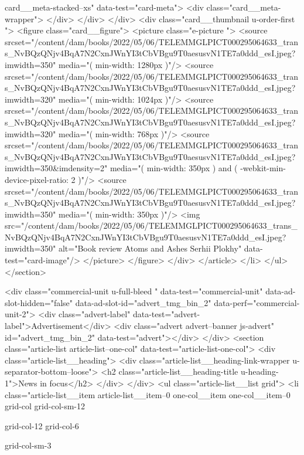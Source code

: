 {{{						
						card__meta-stacked--xs" data-test="card-meta">
<div class="card__meta-wrapper">
</div>
</div>
</div>
<div class="card__thumbnail u-order-first ">
<figure class="card__figure">
<picture class="e-picture   ">
<source srcset="/content/dam/books/2022/05/06/TELEMMGLPICT000295064633_trans_NvBQzQNjv4BqA7N2CxnJWnYI3tCbVBgu9T0aesusvN1TE7a0ddd_esI.jpeg?imwidth=350" media="( min-width: 1280px )"/>
<source srcset="/content/dam/books/2022/05/06/TELEMMGLPICT000295064633_trans_NvBQzQNjv4BqA7N2CxnJWnYI3tCbVBgu9T0aesusvN1TE7a0ddd_esI.jpeg?imwidth=320" media="( min-width: 1024px )"/>
<source srcset="/content/dam/books/2022/05/06/TELEMMGLPICT000295064633_trans_NvBQzQNjv4BqA7N2CxnJWnYI3tCbVBgu9T0aesusvN1TE7a0ddd_esI.jpeg?imwidth=320" media="( min-width: 768px )"/>
<source srcset="/content/dam/books/2022/05/06/TELEMMGLPICT000295064633_trans_NvBQzQNjv4BqA7N2CxnJWnYI3tCbVBgu9T0aesusvN1TE7a0ddd_esI.jpeg?imwidth=350&imdensity=2" media="( min-width: 350px ) and ( -webkit-min-device-pixel-ratio: 2 )"/>
<source srcset="/content/dam/books/2022/05/06/TELEMMGLPICT000295064633_trans_NvBQzQNjv4BqA7N2CxnJWnYI3tCbVBgu9T0aesusvN1TE7a0ddd_esI.jpeg?imwidth=350" media="( min-width: 350px )"/>
<img src="/content/dam/books/2022/05/06/TELEMMGLPICT000295064633_trans_NvBQzQNjv4BqA7N2CxnJWnYI3tCbVBgu9T0aesusvN1TE7a0ddd_esI.jpeg?imwidth=350" alt="Book review Atoms and Ashes Serhii Plokhy" data-test="card-image"/>
</picture>
</figure>
</div>
</article>
</li>
</ul>
</section>

		
			
				
			
	
<div class="commercial-unit u-full-bleed " data-test="commercial-unit" data-ad-slot-hidden="false" data-ad-slot-id="advert_tmg_bin_2" data-perf="commercial-unit-2">
<div class="advert-label" data-test="advert-label">Advertisement</div>
<div class="advert advert--banner js-advert" id="advert_tmg_bin_2" data-test="advert"></div>
</div>
<section class="article-list article-list--one-col" data-test="article-list-one-col">
<div class="article-list__heading">
<div class="article-list__heading-link-wrapper
				u-separator-bottom--loose">
<h2 class="article-list__heading-title u-heading-1">News in focus</h2>
</div>
</div>
<ul class="article-list__list grid">
<li class="article-list__item article-list__item--0 one-col__item one-col__item--0
			grid-col
			grid-col-sm-12
			
			
			grid-col-12
			grid-col-6
			
			
			
			
			
			grid-col-sm-3
			
}}}

